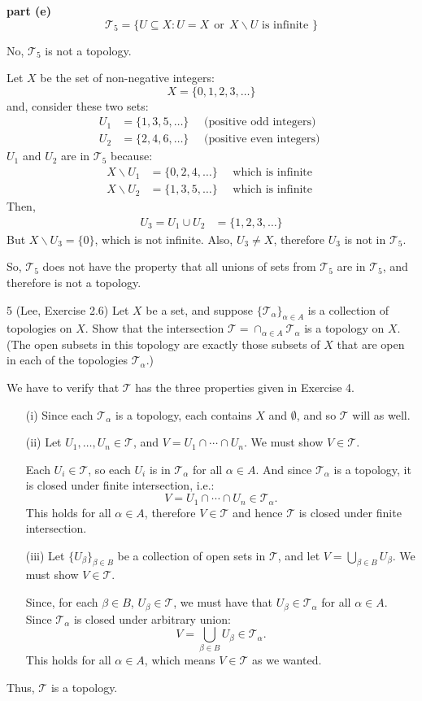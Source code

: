 \documentclass{homework}
\newcommand{\Tau}{\ensuremath{\mathcal{T}}}
\newcommand{\OR}{\ensuremath{\ \ \text{or}\ \ }}
\begin{document}
\textbf{part (e)}\\
$$ \Tau_5 = \{ U \subseteq X : U=X \OR X\backslash U
                               \text{ is infinite } \} $$

No, $\Tau_5$ is not a topology.

Let $X$ be the set of non-negative integers:
$$ X=\{ 0, 1, 2, 3, \ldots \} $$
and, consider these two sets:
\begin{align*}
U_1 &= \{ 1, 3, 5, \ldots \} \quad\text{ (positive odd integers) } \\
U_2 &= \{ 2, 4, 6, \ldots \} \quad\text{ (positive even integers) }
\end{align*}
$U_1$ and $U_2$ are in $\Tau_5$ because:
\begin{align*}
X\backslash U_1 &= \{ 0, 2, 4, \ldots \} \quad\text{ which is infinite }\\
X\backslash U_2 &= \{ 1, 3, 5, \ldots \} \quad\text{ which is infinite }
\end{align*}
Then,
\begin{align*}
U_3 = U_1 \cup U_2 &= \{ 1, 2, 3, \ldots \}
\end{align*}
But $X \backslash U_3 = \{ 0 \}$,
which is not infinite. Also, $U_3 \ne X$, therefore $U_3$ is not in $\Tau_5$.

So, $\Tau_5$ does not have the property that all unions of sets from
$\Tau_5$ are in $\Tau_5$, and therefore is not a topology.

\hrulefill
\begin{exercise}{5 (Lee, Exercise 2.6)}
Let $X$ be a set, and suppose $\{\Tau_\alpha\}_{\alpha\in A}$ is a
collection of topologies on $X$.  Show that the intersection
$\Tau=\cap_{\alpha\in A}\Tau_\alpha$ is a topology on $X$.  (The
open subsets in this topology are exactly those subsets of $X$
that are open in each of the topologies $\Tau_\alpha$.)
\end{exercise}
\solution
We have to verify that $\Tau$ has the three properties
given in Exercise 4.
\begin{itemize}
\item[(i)] Since each $\Tau_\alpha$ is a topology, each contains
$X$ and $\emptyset$, and so $\Tau$ will as well.
\item[(ii)] Let $U_1, \ldots,U_n \in \Tau$, and $V=U_1\cap\cdots\cap U_n$.
We must show $V\in\Tau$.

Each $U_i\in\Tau$, so each $U_i$ is in $\Tau_\alpha$ for all $\alpha\in A$.
And since $\Tau_\alpha$ is a topology, it is closed under finite intersection,
i.e.:
$$ V=U_1\cap\cdots\cap U_n \in \Tau_\alpha.$$
This holds for all $\alpha\in A$, therefore $V\in\Tau$ and hence $\Tau$
is closed under finite intersection.
\item[(iii)] Let $\{U_\beta\}_{\beta\in B}$ be a collection of
open sets in $\Tau$, and let $V=\bigcup_{\beta\in B}U_\beta$.  We must
show $V\in\Tau$.

Since, for each $\beta\in B$, $U_\beta\in\Tau$, we must have that
$U_\beta\in\Tau_\alpha$ for all $\alpha\in A$.  Since $\Tau_\alpha$
is closed under arbitrary union:
$$ V=\bigcup_{\beta\in B}U_\beta \in \Tau_\alpha. $$
This holds for all $\alpha\in A$, which means $V\in\Tau$ as we
wanted.
\end{itemize}
Thus, $\Tau$ is a topology.
\end{document}
